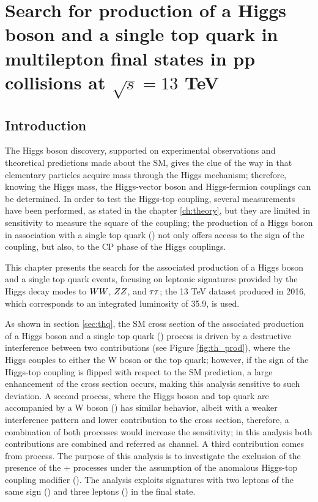 \chapter{Search for production of a Higgs boson and a single top quark in multilepton final states in pp collisions at $\sqrt{s}=13$ TeV}\label{ch:analysis}

\section{Introduction}\label{sec:Intro_analysis}

The Higgs boson discovery, supported on experimental observations and theoretical predictions made about the SM, gives the clue of the way in that elementary particles acquire mass through the Higgs mechanism; therefore, knowing the Higgs mass, the Higgs-vector boson and Higgs-fermion couplings can be determined. In order to test the Higgs-top coupling, several measurements have been performed, as stated in the chapter \ref{ch:theory}, but they are limited in sensitivity to measure the square of the coupling; the production of a Higgs boson in association with a single top quark (\tH) not only offers access to the sign of the coupling, but also, to the CP phase of the Higgs couplings.

This chapter presents the search for the associated production of a Higgs boson and a single top quark events, focusing on leptonic signatures provided by the Higgs decay modes to $WW$, $ZZ$, and $\tau\tau$; the 13 TeV dataset produced in 2016, which corresponds to an integrated luminosity of 35.9\fbinv, is used.

As shown in section \ref{sec:thq}, the SM cross section of the associated production of a Higgs boson and a single top quark (\tHq) process is driven by a destructive interference between two contributions (see Figure \ref{fig:th_prod}), where the Higgs couples to either the W boson or the top quark; however, if the sign of the Higgs-top coupling is flipped with respect to the SM prediction, a large enhancement of the cross section occurs, making this analysis sensitive to such deviation. A second process, where the Higgs boson and top quark are accompanied by a W boson (\tHW) has similar behavior, albeit with a weaker interference pattern and lower contribution to the cross section, therefore, a combination of both processes would increase the sensitivity; in this analysis both contributions are combined and referred as \tH channel. A third contribution comes from \ttH process. The purpose of this analysis is to investigate the exclusion of the presence of the \tH + \ttH processes under the assumption of the anomalous Higgs-top coupling modifier (). The analysis exploits signatures with two leptons of the same sign () and three leptons () in the final state.

